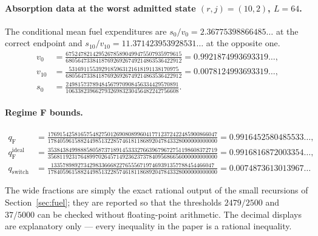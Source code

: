 \documentclass[11pt,a4paper]{article}
\theoremstyle{plain}
\theoremstyle{definition}
\theoremstyle{remark}
\begin{document}
\paragraph{Absorption data at the worst admitted state $(r,j)=(10,2)$, $L=64$.}
The conditional mean fuel expenditures are $s_0/v_0=2.36775398866485\ldots$ at the
correct endpoint and $s_{10}/v_{10}=11.371423953928531\ldots$ at the opposite one.
{\footnotesize
\begin{align*}
v_0&=\frac{675247821429526785890499475507935979615}
          {680564733841876926926749214863536422912}=0.9921874993693319\ldots,\\[2pt]
v_{10}&=\frac{5316911553929185963121618191138170975}
             {680564733841876926926749214863536422912}=0.0078124993693319\ldots,\\[2pt]
s_0&=\frac{24981573789484567970908456334429570891}
          {10633823966279326983230456482242756608}.
\end{align*}}

\paragraph{Regime F bounds.}
{\footnotesize
\begin{align*}
q_{\mathrm F}&=\frac{176915425816575482750126908089960417712372422485900866047}
                    {178405961588244985132285746181186892047843328000000000000}
 =0.9916452580485533\ldots,\\[2pt]
q_{\mathrm F}^{\mathrm{ideal}}&=
 \frac{353843849988858058737189145333276639679672751198608372719}
      {356811923176489970264571492362373784095686656000000000000}
 =0.9916816872003354\ldots,\\[2pt]
q_{\mathrm{switch}}&=
 \frac{1335789892734298336668227655567197469391357788454466047}
      {178405961588244985132285746181186892047843328000000000000}
 =0.0074873613013967\ldots
\end{align*}}

The wide fractions are simply the exact rational output of the small recursions of
Section~\ref{sec:fuel}; they are reported so that the thresholds $2479/2500$ and
$37/5000$ can be checked without floating-point arithmetic. The decimal displays are
explanatory only --- every inequality in the paper is a rational inequality.



\end{document}
